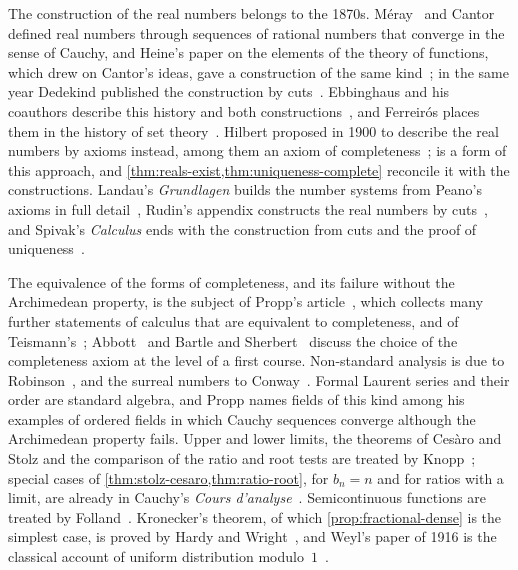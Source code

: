 \chapternotes

The construction of the real numbers belongs to the 1870s. Méray~\cite{meray1869} and Cantor~\cite{cantor1872} defined real numbers through sequences of rational numbers that converge in the sense of Cauchy, and Heine's paper on the elements of the theory of functions, which drew on Cantor's ideas, gave a construction of the same kind~\cite{heine1872}; in the same year Dedekind published the construction by cuts~\cite{dedekind1872}. Ebbinghaus and his coauthors describe this history and both constructions~\cite{ebbinghaus1991}, and Ferreir\'os places them in the history of set theory~\cite{ferreiros2007}. Hilbert proposed in 1900 to describe the real numbers by axioms instead, among them an axiom of completeness~\cite{hilbert1900zahlbegriff};  is a form of this approach, and \cref{thm:reals-exist,thm:uniqueness-complete} reconcile it with the constructions. Landau's \emph{Grundlagen} builds the number systems from Peano's axioms in full detail~\cite{landau1930}, Rudin's appendix constructs the real numbers by cuts~\cite{rudin1976}, and Spivak's \emph{Calculus} ends with the construction from cuts and the proof of uniqueness~\cite{spivak2008calculus}.

The equivalence of the forms of completeness, and its failure without the Archimedean property, is the subject of Propp's article~\cite{propp2013}, which collects many further statements of calculus that are equivalent to completeness, and of Teismann's~\cite{teismann2013}; Abbott~\cite{abbott2015} and Bartle and Sherbert~\cite{bartle2011} discuss the choice of the completeness axiom at the level of a first course. Non-standard analysis is due to Robinson~\cite{robinson1966}, and the surreal numbers to Conway~\cite{conway1976}. Formal Laurent series and their order are standard algebra, and Propp names fields of this kind among his examples of ordered fields in which Cauchy sequences converge although the Archimedean property fails. Upper and lower limits, the theorems of Ces\`aro and Stolz and the comparison of the ratio and root tests are treated by Knopp~\cite{knopp1990}; special cases of \cref{thm:stolz-cesaro,thm:ratio-root}, for $b_n=n$ and for ratios with a limit, are already in Cauchy's \emph{Cours d'analyse}~\cite{cauchy1821}. Semicontinuous functions are treated by Folland~\cite{folland1999}. Kronecker's theorem, of which \cref{prop:fractional-dense} is the simplest case, is proved by Hardy and Wright~\cite{hardywright2008}, and Weyl's paper of 1916 is the classical account of uniform distribution modulo~$1$~\cite{weyl1916}.

